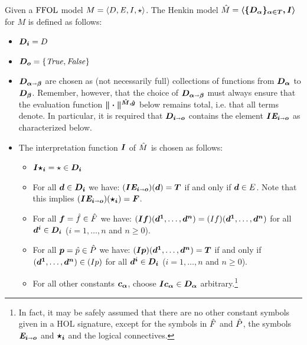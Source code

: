 \begin{definition}\label{def:hm}
Given a $\text{\textrm{FFOL}}$ model $M = \langle D, \mathit{E}, I, \star\rangle$. The Henkin
model $\hat{M} = \boldsymbol{\langle \{D_\alpha\}_{\alpha \in {T}},I \rangle}$ for
$M$ is defined as follows: 
\begin{itemize}
\item $\boldsymbol{D_i} = D$
\item $\boldsymbol{D_o} = \{\mathit{True},\mathit{False}\}$
\item $\boldsymbol{D_{\alpha\shortrightarrow\beta}}$ are
chosen as (not necessarily full) collections of functions from
$\boldsymbol{D_\alpha}$ to $\boldsymbol{D_\beta}$. Remember, however, that the
choice of $\boldsymbol{D_{\alpha\shortrightarrow\beta}}$ must always ensure that 
the evaluation function 
 $\boldsymbol{\|\cdot\|^{\hat{M},\hat{g}}}$ below remains total, i.e. that
 all terms denote. In particular, it is required that $\boldsymbol{D_{i\shortrightarrow
     o}}$ contains the element $\boldsymbol{I \mathit{E}_{i\shortrightarrow
     o}}$ as characterized below.
\item The interpretation function $\boldsymbol{I}$ of $\hat{M}$
  is chosen as follows:
\begin{itemize}
\item  $\boldsymbol{I \star_i} = \star \in \boldsymbol{D_i}$
\item  For all
    $\boldsymbol{d} \in \boldsymbol{D_i}$ we have: $(\boldsymbol{I \mathit{E}_{i\shortrightarrow o}})(\boldsymbol{d}) =
    \boldsymbol{T}$  if and only if $\boldsymbol{d} \in E$. Note that this implies $(\boldsymbol{I \mathit{E}_{i\shortrightarrow o}})(\boldsymbol{\star_i}) = \boldsymbol{F}$.
\item \sloppy For all $\boldsymbol{f} = \hat{f} \in \hat{F}$ we
       have: $(\boldsymbol{I} \boldsymbol{f})(\boldsymbol{d^1},\ldots,\boldsymbol{d^n}) = (I f)(\boldsymbol{d^1},\ldots,\boldsymbol{d^n})$ for
       all $\boldsymbol{d^i}\in \boldsymbol{D_i}$ ($i=1,\ldots,n$ and
       $n\geq 0$).
\item \sloppy For all $\boldsymbol{p} = \hat{p} \in \hat{P}$ we
       have: $(\boldsymbol{I} \boldsymbol{p})(\boldsymbol{d^1},\ldots,\boldsymbol{d^n}) = \boldsymbol{T}$
       if and only if $(\boldsymbol{d^1},\ldots,\boldsymbol{d^n}) \in (I p)$ for
       all $\boldsymbol{d^i}\in \boldsymbol{D_i}$ ($i=1,\ldots,n$ and
       $n\geq 0$).
\item For all other constants $\boldsymbol{c_\alpha}$, choose $\boldsymbol{I
    c_\alpha} \in \boldsymbol{D_\alpha}$ arbitrary.\footnote{In fact, it may be safely assumed that there are
  no other constant symbols given in a HOL signature, except for the symbols in
  $\hat{F}$ and $\hat{P}$, the symbols $\boldsymbol{\mathit{E}_{i\shortrightarrow o}}$  and $\boldsymbol{\star_{i}}$ and the logical connectives.}
\end{itemize}
\end{itemize}


\end{definition}
